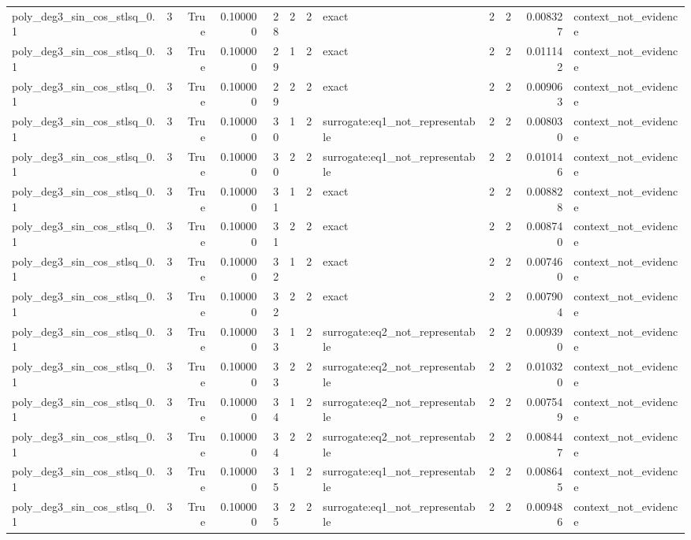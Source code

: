 \begin{tabular}{lrrrrrrlrrrl}
poly\_deg3\_sin\_cos\_stlsq\_0.1 & 3 & True & 0.100000 & 28 & 2 & 2 & exact & 2 & 2 & 0.008327 & context\_not\_evidence \\
poly\_deg3\_sin\_cos\_stlsq\_0.1 & 3 & True & 0.100000 & 29 & 1 & 2 & exact & 2 & 2 & 0.011142 & context\_not\_evidence \\
poly\_deg3\_sin\_cos\_stlsq\_0.1 & 3 & True & 0.100000 & 29 & 2 & 2 & exact & 2 & 2 & 0.009063 & context\_not\_evidence \\
poly\_deg3\_sin\_cos\_stlsq\_0.1 & 3 & True & 0.100000 & 30 & 1 & 2 & surrogate:eq1\_not\_representable & 2 & 2 & 0.008030 & context\_not\_evidence \\
poly\_deg3\_sin\_cos\_stlsq\_0.1 & 3 & True & 0.100000 & 30 & 2 & 2 & surrogate:eq1\_not\_representable & 2 & 2 & 0.010146 & context\_not\_evidence \\
poly\_deg3\_sin\_cos\_stlsq\_0.1 & 3 & True & 0.100000 & 31 & 1 & 2 & exact & 2 & 2 & 0.008828 & context\_not\_evidence \\
poly\_deg3\_sin\_cos\_stlsq\_0.1 & 3 & True & 0.100000 & 31 & 2 & 2 & exact & 2 & 2 & 0.008740 & context\_not\_evidence \\
poly\_deg3\_sin\_cos\_stlsq\_0.1 & 3 & True & 0.100000 & 32 & 1 & 2 & exact & 2 & 2 & 0.007460 & context\_not\_evidence \\
poly\_deg3\_sin\_cos\_stlsq\_0.1 & 3 & True & 0.100000 & 32 & 2 & 2 & exact & 2 & 2 & 0.007904 & context\_not\_evidence \\
poly\_deg3\_sin\_cos\_stlsq\_0.1 & 3 & True & 0.100000 & 33 & 1 & 2 & surrogate:eq2\_not\_representable & 2 & 2 & 0.009390 & context\_not\_evidence \\
poly\_deg3\_sin\_cos\_stlsq\_0.1 & 3 & True & 0.100000 & 33 & 2 & 2 & surrogate:eq2\_not\_representable & 2 & 2 & 0.010320 & context\_not\_evidence \\
poly\_deg3\_sin\_cos\_stlsq\_0.1 & 3 & True & 0.100000 & 34 & 1 & 2 & surrogate:eq2\_not\_representable & 2 & 2 & 0.007549 & context\_not\_evidence \\
poly\_deg3\_sin\_cos\_stlsq\_0.1 & 3 & True & 0.100000 & 34 & 2 & 2 & surrogate:eq2\_not\_representable & 2 & 2 & 0.008447 & context\_not\_evidence \\
poly\_deg3\_sin\_cos\_stlsq\_0.1 & 3 & True & 0.100000 & 35 & 1 & 2 & surrogate:eq1\_not\_representable & 2 & 2 & 0.008645 & context\_not\_evidence \\
poly\_deg3\_sin\_cos\_stlsq\_0.1 & 3 & True & 0.100000 & 35 & 2 & 2 & surrogate:eq1\_not\_representable & 2 & 2 & 0.009486 & context\_not\_evidence \\

\end{tabular}
